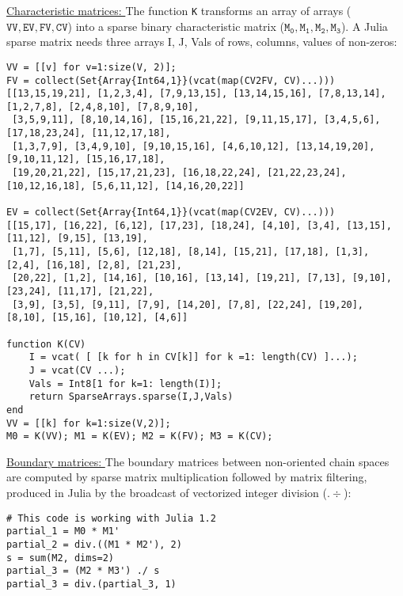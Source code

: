 \vspace{10pt}
\noindent\underline{
Characteristic matrices:
}\vspace{0.2em}\newline 
The function \texttt{K} transforms an array of arrays ($\mathtt{VV, EV, FV, CV}$) into a sparse binary characteristic matrix
($\mathtt{M_0, M_1, M_2, M_3}$). A Julia sparse matrix needs three arrays I, J, Vals of rows, columns, values of non-zeros:

\begin{Verbatim}[fontsize=\footnotesize]
VV = [[v] for v=1:size(V, 2)];
FV = collect(Set{Array{Int64,1}}(vcat(map(CV2FV, CV)...)))
[[13,15,19,21], [1,2,3,4], [7,9,13,15], [13,14,15,16], [7,8,13,14], [1,2,7,8], [2,4,8,10], [7,8,9,10], 
 [3,5,9,11], [8,10,14,16], [15,16,21,22], [9,11,15,17], [3,4,5,6], [17,18,23,24], [11,12,17,18], 
 [1,3,7,9], [3,4,9,10], [9,10,15,16], [4,6,10,12], [13,14,19,20], [9,10,11,12], [15,16,17,18], 
 [19,20,21,22], [15,17,21,23], [16,18,22,24], [21,22,23,24], [10,12,16,18], [5,6,11,12], [14,16,20,22]]

EV = collect(Set{Array{Int64,1}}(vcat(map(CV2EV, CV)...)))
[[15,17], [16,22], [6,12], [17,23], [18,24], [4,10], [3,4], [13,15], [11,12], [9,15], [13,19],
 [1,7], [5,11], [5,6], [12,18], [8,14], [15,21], [17,18], [1,3], [2,4], [16,18], [2,8], [21,23],
 [20,22], [1,2], [14,16], [10,16], [13,14], [19,21], [7,13], [9,10], [23,24], [11,17], [21,22],
 [3,9], [3,5], [9,11], [7,9], [14,20], [7,8], [22,24], [19,20], [8,10], [15,16], [10,12], [4,6]]

function K(CV)
    I = vcat( [ [k for h in CV[k]] for k =1: length(CV) ]...);
    J = vcat(CV ...);
    Vals = Int8[1 for k=1: length(I)];
    return SparseArrays.sparse(I,J,Vals)
end
VV = [[k] for k=1:size(V,2)];
M0 = K(VV); M1 = K(EV); M2 = K(FV); M3 = K(CV);
\end{Verbatim}

\vspace{10pt}
\noindent\underline{
Boundary matrices:
}\vspace{0.2em}\newline 
The boundary matrices between non-oriented chain spaces are computed by sparse matrix multiplication
followed by matrix filtering, produced in Julia by the broadcast of vectorized integer division ($.\div$):

%
%


\begin{Verbatim}[fontsize=\footnotesize]
# This code is working with Julia 1.2
partial_1 = M0 * M1'  
partial_2 = div.((M1 * M2'), 2)
s = sum(M2, dims=2)
partial_3 = (M2 * M3') ./ s
partial_3 = div.(partial_3, 1)
\end{Verbatim}

